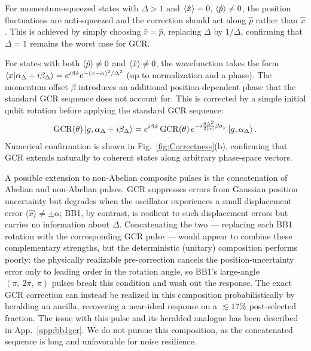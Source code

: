 \documentclass[aps,prx,showpacs,notitlepage,twocolumn,superscriptaddress,nofootinbib,preprintnumbers,floatfix,10pt, longbibliography]{revtex4-2}
\begin{document}
For momentum-squeezed states with $\Delta>1$ and $\braket{\hat{x}}=0$, $\braket{\hat{p}}\neq 0$, 
the position fluctuations are anti-squeezed and the correction should act along $\hat{p}$ rather 
than $\hat{x}$. This is achieved by simply choosing $\hat{v}=\hat{p}$, replacing $\Delta$ by $1/\Delta$, confirming that $\Delta=1$ remains 
the worst case for GCR.

For states with both $\braket{\hat{p}}\neq 0$ and $\braket{\hat{x}}\neq 0$, the wavefunction 
takes the form $\braket{x|\alpha_\Delta+i\beta_\Delta}=e^{i\beta\hat{x}}e^{-(x-\alpha)^2/\Delta^2}$ 
(up to normalization and a phase). The momentum offset $\beta$ introduces an additional 
position-dependent phase that the standard GCR sequence does not account for. This is corrected 
by a simple initial qubit rotation before applying the standard GCR sequence:
\begin{align}
    \mathrm{GCR}(\theta)\ket{g,\alpha_\Delta+i\beta_\Delta}
    = e^{i\beta\hat{x}}\,\mathrm{GCR}(\theta)\,
    e^{-i\frac{\theta\Delta^2}{2|\alpha|}\beta\sigma_\mathrm{y}}
    \ket{g,\alpha_\Delta}.
    \label{eq:pnot0}
\end{align}
Numerical confirmation is shown in Fig.~\ref{fig:Correctness}(b), confirming that GCR extends 
naturally to coherent states along arbitrary phase-space vectors.

A possible extension to non-Abelian composite pulses is the concatenation of Abelian and non-Abelian pulses. GCR suppresses errors from Gaussian position uncertainty but degrades when the oscillator experiences a small displacement error $\langle\hat{x}\rangle\neq\pm\alpha$; BB1, by contrast, is resilient to such displacement errors but carries no information about $\Delta$. Concatenating the two --- replacing each BB1 rotation with the corresponding GCR pulse --- would appear to combine these complementary strengths, but the deterministic (unitary) composition performs poorly: the physically realizable pre-correction cancels the position-uncertainty error only to leading order in the rotation angle, so BB1's large-angle $(\pi,\ 2\pi, \ \pi)$ pulses break this condition and wash out the response. The exact GCR correction can instead be realized in this composition probabilistically by heralding an ancilla, recovering a near-ideal response on a $\lesssim\!17\%$ post-selected fraction. The issue with this pulse and its heralded  analogue has been described in App.~\ref{app:bb1gcr}. We do not pursue this composition, as the concatenated sequence is long and unfavorable for noise resilience.
\end{document}
